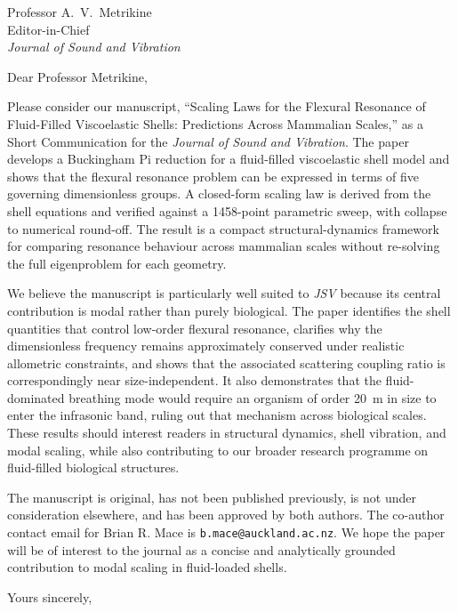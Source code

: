 \documentclass[11pt]{letter}
\date{\today}
\begin{document}
\begin{letter}{%
Professor A.\ V.\ Metrikine\\
Editor-in-Chief\\
\textit{Journal of Sound and Vibration}}

\opening{Dear Professor Metrikine,}
\small

Please consider our manuscript, ``Scaling Laws for the Flexural Resonance of Fluid-Filled Viscoelastic Shells: Predictions Across Mammalian Scales,'' as a Short Communication for the \textit{Journal of Sound and Vibration}. The paper develops a Buckingham Pi reduction for a fluid-filled viscoelastic shell model and shows that the flexural resonance problem can be expressed in terms of five governing dimensionless groups. A closed-form scaling law is derived from the shell equations and verified against a 1458-point parametric sweep, with collapse to numerical round-off. The result is a compact structural-dynamics framework for comparing resonance behaviour across mammalian scales without re-solving the full eigenproblem for each geometry.

We believe the manuscript is particularly well suited to \textit{JSV} because its central contribution is modal rather than purely biological. The paper identifies the shell quantities that control low-order flexural resonance, clarifies why the dimensionless frequency remains approximately conserved under realistic allometric constraints, and shows that the associated scattering coupling ratio is correspondingly near size-independent. It also demonstrates that the fluid-dominated breathing mode would require an organism of order \SI{20}{\metre} in size to enter the infrasonic band, ruling out that mechanism across biological scales. These results should interest readers in structural dynamics, shell vibration, and modal scaling, while also contributing to our broader research programme on fluid-filled biological structures.

The manuscript is original, has not been published previously, is not under consideration elsewhere, and has been approved by both authors. The co-author contact email for Brian R. Mace is \texttt{b.mace@auckland.ac.nz}. We hope the paper will be of interest to the journal as a concise and analytically grounded contribution to modal scaling in fluid-loaded shells.

\closing{Yours sincerely,}

\end{letter}
\end{document}
